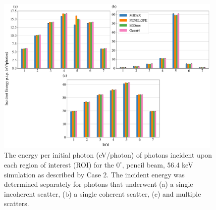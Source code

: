\FloatBarrier



\begin{figure}[htpb]
    \centering
	\includegraphics[width=0.98\textwidth]{../figures/ROI_0_deg_pencil_paper_ready.pdf}
	\caption{The energy per initial photon (eV/photon) of photons incident upon each region of interest (ROI) for the $0^\circ$, pencil beam, 56.4 keV simulation as described by Case 2. The incident energy was determined separately for photons that underwent (a) a single incoherent scatter, (b) a single coherent scatter, (c) and multiple scatters.}
	\label{fig:ROIPGraph}
\end{figure}


